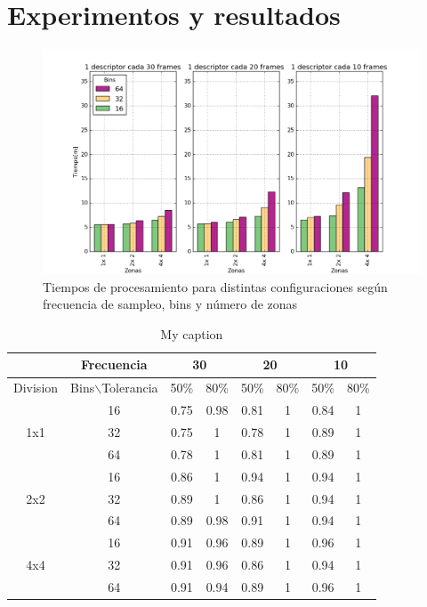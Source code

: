 \documentclass[14pt,letterpaper,hidelinks]{extarticle}
\begin{document}
\section{Experimentos y resultados}
\begin{figure}[ht!]
\centering 
\captionsetup{justification=centering,margin=2cm}
\includegraphics[scale=0.6]{img/experimentos.png}
\caption{Tiempos de procesamiento para distintas configuraciones según frecuencia de sampleo, bins y número de zonas\label{fig:experimentos}}
\end{figure} 

\begin{table}[]
\centering
\caption{My caption}
\label{my-label}
\begin{tabular}{c|c|c|c|c|c|c|c|}
\cline{2-8}
 & Frecuencia & \multicolumn{2}{c|}{30} & \multicolumn{2}{c|}{20} & \multicolumn{2}{c|}{10} \\ \hline
\multicolumn{1}{|c|}{Division} & Bins$\backslash$Tolerancia & 50\% & 80\% & 50\% & 80\% & 50\% & 80\% \\ \hline
\multicolumn{1}{|c|}{\multirow{3}{*}{1x1}} & 16 & 0.75 & 0.98 & 0.81 & 1 & 0.84 & 1 \\ \cline{2-8} 
\multicolumn{1}{|c|}{} & 32 & 0.75 & 1 & 0.78 & 1 & 0.89 & 1 \\ \cline{2-8} 
\multicolumn{1}{|c|}{} & 64 & 0.78 & 1 & 0.81 & 1 & 0.89 & 1 \\ \hline
\multicolumn{1}{|c|}{\multirow{3}{*}{2x2}} & 16 & 0.86 & 1 & 0.94 & 1 & 0.94 & 1 \\ \cline{2-8} 
\multicolumn{1}{|c|}{} & 32 & 0.89 & 1 & 0.86 & 1 & 0.94 & 1 \\ \cline{2-8} 
\multicolumn{1}{|c|}{} & 64 & 0.89 & 0.98 & 0.91 & 1 & 0.94 & 1 \\ \hline
\multicolumn{1}{|c|}{\multirow{3}{*}{4x4}} & 16 & 0.91 & 0.96 & 0.89 & 1 & 0.96 & 1 \\ \cline{2-8} 
\multicolumn{1}{|c|}{} & 32 & 0.91 & 0.96 & 0.86 & 1 & 0.94 & 1 \\ \cline{2-8} 
\multicolumn{1}{|c|}{} & 64 & 0.91 & 0.94 & 0.89 & 1 & 0.96 & 1 \\ \hline
\end{tabular}
\end{table}
\end{document}
